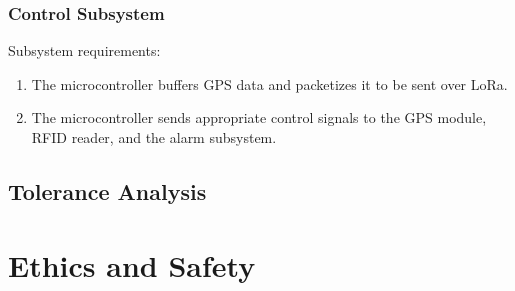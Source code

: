 \documentclass[]{article}
\begin{document}
\subsubsection{Control Subsystem}

Subsystem requirements: 

\begin{enumerate}
	\item The microcontroller buffers GPS data and packetizes it to be sent over LoRa. 
	\item The microcontroller sends appropriate control signals to the GPS module, RFID reader, and the alarm subsystem. 
\end{enumerate}

\subsection{Tolerance Analysis}

\section{Ethics and Safety}
\end{document}
